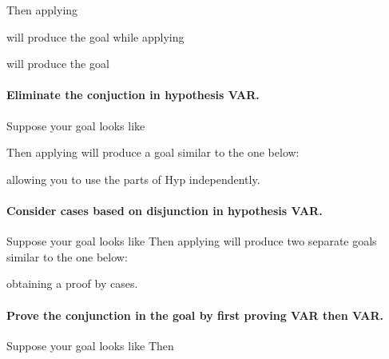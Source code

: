 Then applying 

will produce the goal 
while applying

will produce the goal 

\paragraph{\bf Eliminate the conjuction in hypothesis VAR.}

Suppose your goal looks like

Then applying 
will produce a goal similar to the one below:

allowing you to use the parts of Hyp independently.


\paragraph{\bf Consider cases based on disjunction in hypothesis VAR.}
Suppose your goal looks like
Then applying 
will produce two separate goals similar to the one below:


obtaining a proof by cases.

\paragraph{\bf Prove the conjunction in the goal by first proving VAR then VAR.}
Suppose your goal looks like
 Then 
 
